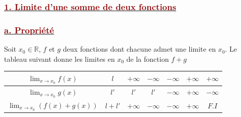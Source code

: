 \documentclass[12pt,a4paper]{article}
\begin{document}
\subsubsection*{\underline{\textcolor{darkred}{ 1. Limite d’une somme de deux fonctions }}}
\subsubsection*{\underline{\textcolor{darkred}{ a. Propriété }}}
Soit $x_0 \in \mathbb{R}$, $f$ et $g$ deux fonctions dont chacune admet une limite en $x_0$. Le tableau suivant donne les limites en $x_0$ de la fonction $f + g$

\vspace{0.4cm}

\centering
\renewcommand{\arraystretch}{1.5}
\begin{tabular}{|c|c|c|c|c|c|c|}
    \hline
    $\displaystyle \lim_{x \to x_0} f(x)$ & $l$ & $+\infty$ & $-\infty$ & $-\infty$ & $+\infty$ & $+\infty$ \\
    \hline
    $\displaystyle \lim_{x \to x_0} g(x)$ & $l'$ & $l'$ & $l'$ & $-\infty$ & $+\infty$ & $-\infty$ \\
    \hline
    $\displaystyle \lim_{x \to x_0} (f(x) + g(x))$ & $l + l'$ & $+\infty$ & $-\infty$ & $-\infty$ & $+\infty$ & $F.I$ \\
    \hline
\end{tabular}
\end{document}
